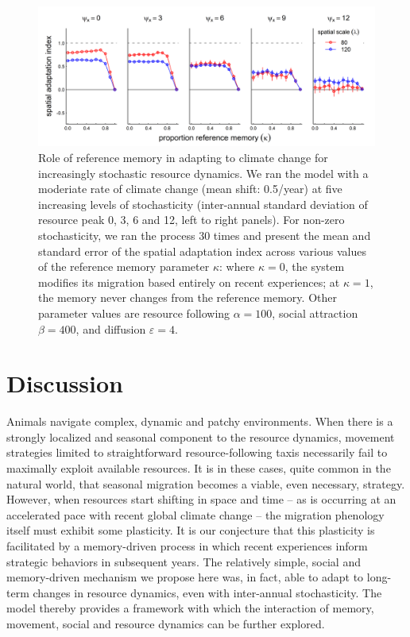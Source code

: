 \documentclass[utf8]{frontiersSCNS} %
\begin{document}
	\begin{figure}
		
		\includegraphics[width=\textwidth]{figures/TrendStochasticity.png}
		
		\caption{ \label{fig_trendstochasticity} Role of reference memory in adapting to climate change for increasingly stochastic resource dynamics. We ran the model with a moderiate rate of climate change (mean shift: 0.5/year) at five increasing levels of stochasticity (inter-annual standard deviation of resource peak 0, 3, 6 and 12, left to right panels). For non-zero stochasticity, we ran the process 30 times and present the mean and standard error of the spatial adaptation index across various values of the reference memory parameter $\kappa$: where $\kappa = 0$, the system modifies its migration based entirely on recent experiences; at $\kappa = 1$, the memory never changes from the reference memory. Other parameter values are resource following $\alpha = 100$, social attraction $\beta = 400$, and diffusion $\varepsilon = 4$.}
		
	\end{figure}
	
\section{Discussion}
	
	Animals navigate complex, dynamic and patchy environments. When there is a strongly localized and seasonal component to the resource dynamics, movement strategies limited to straightforward resource-following taxis necessarily fail to maximally exploit available resources. It is in these cases, quite common in the natural world, that seasonal migration becomes a viable, even necessary, strategy.  However, when resources start shifting in space and time -- as is occurring at an accelerated pace with recent global climate change -- the migration phenology itself must exhibit some plasticity. It is our conjecture that this plasticity is facilitated by a memory-driven process in which recent experiences inform strategic behaviors in subsequent years. The relatively simple, social and memory-driven mechanism we propose here was, in fact, able to adapt to long-term changes in resource dynamics, even with inter-annual stochasticity. The model thereby provides a framework with which the interaction  of memory, movement, social and resource dynamics can be further explored.	
		
\end{document}
